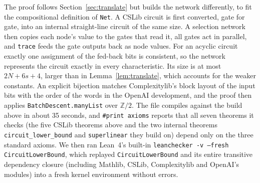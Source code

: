 \documentclass[11pt]{article}
\theoremstyle{definition}
\begin{document}
The proof follows Section~\ref{sec:translate} but builds the network differently, to fit the compositional definition of \texttt{Net}. A CSLib circuit is first converted, gate for gate, into an internal straight-line circuit of the same size. A selection network then copies each node's value to the gates that read it, all gates act in parallel, and \texttt{trace} feeds the gate outputs back as node values. For an acyclic circuit exactly one assignment of the fed-back bits is consistent, so the network represents the circuit exactly in every characteristic. Its size is at most $2N+6s+4$, larger than in Lemma~\ref{lem:translate}, which accounts for the weaker constants. An explicit bijection matches Complexitylib's block layout of the input bits with the order of the words in the OpenAI development, and the proof then applies \texttt{BatchDescent.manyList} over $\mathbb{Z}/2$. The file compiles against the build above in about 35 seconds, and \texttt{\#print axioms} reports that all seven theorems it checks (the five CSLib theorems above and the two internal theorems \texttt{circuit\_lower\_bound} and \texttt{superlinear} they build on) depend only on the three standard axioms. We then ran Lean~4's built-in \texttt{leanchecker -v --fresh CircuitLowerBound}, which replayed \texttt{CircuitLowerBound} and its entire transitive dependency closure (including Mathlib, CSLib, Complexitylib and OpenAI's modules) into a fresh kernel environment without errors.
\end{document}
